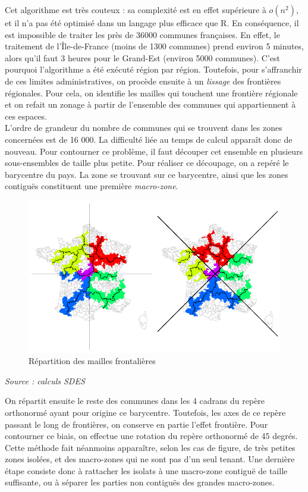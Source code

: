 \documentclass[12pt, a4paper]{article}
\begin{document}
Cet algorithme est très couteux : sa complexité est en effet supérieure à $o(n^2)$, et il n'a pas été optimisé dans un langage plus efficace que R. En conséquence, il est impossible de traiter les près de 36000 communes françaises. En effet, le traitement de l'Île-de-France (moins de 1300 communes) prend environ 5 minutes, alors qu'il faut 3 heures pour le Grand-Est (environ 5000 communes). C'est pourquoi l'algorithme a été exécuté région par région. Toutefois, pour s'affranchir de ces limites administratives, on procède ensuite à un \emph{lissage} des frontières régionales. Pour cela, on identifie les mailles qui touchent une frontière régionale et on refait un zonage à partir de l'ensemble des communes qui appartiennent à ces espaces.\\
L'ordre de grandeur du nombre de communes qui se trouvent dans les zones concernées est de 16 000. La difficulté liée au temps de calcul apparaît donc de nouveau. Pour contourner ce problème, il faut découper cet ensemble en plusieurs sous-ensembles de taille plus petite. Pour réaliser ce découpage, on a repéré le barycentre du pays. La zone se trouvant sur ce barycentre, ainsi que les zones contiguës constituent une première \emph{macro-zone}.



\begin{figure}[H]
\caption{Répartition des mailles frontalières}
\begin{center}
\includegraphics[scale=.7]{img/Methodo_decoupage.png}
\end{center}
\end{figure}
\emph{Source : calculs SDES}


On répartit ensuite le reste des communes dans les 4 cadrans du repère orthonormé ayant pour origine ce barycentre. Toutefois, les axes de ce repère passant le long de frontières, on conserve en partie l'effet frontière. Pour contourner ce biais, on effectue une rotation du repère orthonormé de 45 degrés.
Cette méthode fait néanmoins apparaître, selon les cas de figure, de très petites zones isolées, et des macro-zones qui ne sont pas d'un seul tenant. Une dernière étape consiste donc à rattacher les isolats à une macro-zone contiguë de taille suffisante, ou à séparer les parties non contiguës des grandes macro-zones.
\end{document}
